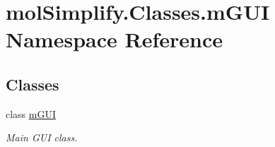 \hypertarget{namespacemolSimplify_1_1Classes_1_1mGUI}{}\section{mol\+Simplify.\+Classes.\+m\+G\+UI Namespace Reference}
\label{namespacemolSimplify_1_1Classes_1_1mGUI}
\subsection*{Classes}
\begin{DoxyCompactItemize}
\item 
class \hyperlink{classmolSimplify_1_1Classes_1_1mGUI_1_1mGUI}{m\+G\+UI}
\begin{DoxyCompactList}\small\item\em Main G\+UI class. \end{DoxyCompactList}\end{DoxyCompactItemize}
